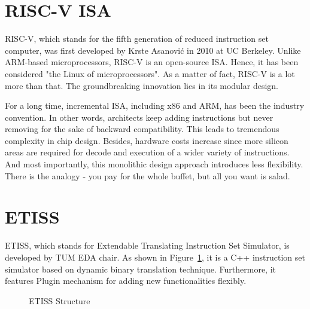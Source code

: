 \section{RISC-V ISA}

RISC-V, which stands for the fifth generation of reduced instruction set computer, was first developed by Krste Asanović in 2010 at UC Berkeley.
Unlike ARM-based microprocessors, RISC-V is an open-source ISA. Hence, it has been considered "the Linux of microprocessors".
As a matter of fact, RISC-V is a lot more than that. The groundbreaking innovation lies in its modular design.

For a long time, incremental ISA, including x86 and ARM, has been the industry convention. In other words, architects keep adding instructions but never removing for the sake of backward compatibility.  
This leads to tremendous complexity in chip design. Besides, hardware costs increase since more silicon areas are required for decode and execution of a wider variety of instructions. And most importantly,
this monolithic design approach introduces less flexibility. There is the analogy - you pay for the whole buffet, but all you want is salad.   

\section{ETISS}

ETISS, which stands for Extendable Translating Instruction Set Simulator, is developed by TUM EDA chair.
As shown in Figure~\ref{fig:etiss_structure}, it is a C++ instruction set simulator based on dynamic binary translation technique. Furthermore, it features Plugin mechanism for adding new functionalities flexibly.

\begin{figure}[htbp]
    \caption{ETISS Structure}
    \label{fig:etiss_structure}
\end{figure}

